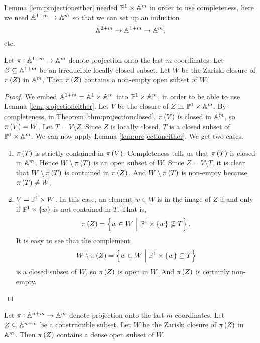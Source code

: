 Lemma \ref{lem:projectioneither} needed $ \PP^1 \times \AA^m $ in order to use completeness, here we need $ \AA^{1 + m} \to \AA^m $ so that we can set up an induction
$$ \AA^{2 + m} \to \AA^{1 + m} \to \AA^m, $$
etc.

\begin{lemma}
\label{lem:projectionopen}
Let $ \pi : \AA^{1 + m} \to \AA^m $ denote projection onto the last $ m $ coordinates. Let $ Z \subseteq \AA^{1 + m} $ be an irreducible locally closed subset. Let $ W $ be the Zariski closure of $ \pi\br{Z} $ in $ \AA^m $. Then $ \pi\br{Z} $ contains a non-empty open subset of $ W $.
\end{lemma}

\begin{proof}
We embed $ \AA^{1 + m} = \AA^1 \times \AA^m $ into $ \PP^1 \times \AA^m $, in order to be able to use Lemma \ref{lem:projectioneither}. Let $ V $ be the closure of $ Z $ in $ \PP^1 \times \AA^m $. By completeness, in Theorem \ref{thm:projectionclosed}, $ \pi\br{V} $ is closed in $ \AA^m $, so $ \pi\br{V} = W $. Let $ T = V \setminus Z $. Since $ Z $ is locally closed, $ T $ is a closed subset of $ \PP^1 \times \AA^m $. We can now apply Lemma \ref{lem:projectioneither}. We get two cases.
\begin{enumerate}[label=Case \arabic*., leftmargin=0.5in]
\item $ \pi\br{T} $ is strictly contained in $ \pi\br{V} $. Completeness tells us that $ \pi\br{T} $ is closed in $ \AA^m $. Hence $ W \setminus \pi\br{T} $ is an open subset of $ W $. Since $ Z = V \setminus T $, it is clear that $ W \setminus \pi\br{T} $ is contained in $ \pi\br{Z} $. And $ W \setminus \pi\br{T} $ is non-empty because $ \pi\br{T} \ne W $.
\item $ V = \PP^1 \times W $. In this case, an element $ w \in W $ is in the image of $ Z $ if and only if $ \PP^1 \times \cbr{w} $ is not contained in $ T $. That is,
$$ \pi\br{Z} = \cbr{w \in W \st \PP^1 \times \cbr{w} \not\subseteq T}. $$
It is easy to see that the complement
$$ W \setminus \pi\br{Z} = \cbr{w \in W \st \PP^1 \times \cbr{w} \subseteq T} $$
is a closed subset of $ W $, so $ \pi\br{Z} $ is open in $ W $. And $ \pi\br{Z} $ is certainly non-empty.
\end{enumerate}
\end{proof}

\begin{corollary}
\label{cor:projectionopen}
Let $ \pi : \AA^{n + m} \to \AA^m $ denote projection onto the last $ m $ coordinates. Let $ Z \subseteq \AA^{n + m} $ be a constructible subset. Let $ W $ be the Zariski closure of $ \pi\br{Z} $ in $ \AA^m $. Then $ \pi\br{Z} $ contains a dense open subset of $ W $.
\end{corollary}

